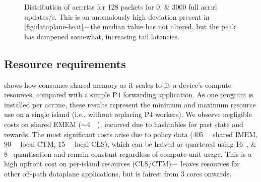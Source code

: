 \begin{figure}
	\centering
		\caption[Distribution of RTTs for \qty{128}{\byte} packets for \numlist{0;3000} full RL updates/s.]{Distribution of \glspl{acr:rtt} for \qty{128}{\byte} packets for \numlist{0;3000} full \gls{acr:rl} updates/s. This is an anomalously high deviation present in \cref{fig:dataplane-heat}---the median value has not altered, but the peak has dampened somewhat, increasing tail latencies.\label{fig:dataplane-example}}
	
\end{figure}

\subsection{Resource requirements}
 shows how \approachshort{} consumes shared memory as it scales to fit a device's compute resources, compared with a simple P4 forwarding application.
As one program is installed per \gls{acr:me}, these results represent the minimum and maximum resource use on a single island (i.e., without replacing P4 workers).
We observe negligible costs on shared EMEM ($\sim$\qty{4}{\mebi\byte}), incurred due to hashtables for past state and rewards.
The most significant costs arise due to policy data (\qty{405}{\kibi\byte} shared IMEM, \qty{90}{\kibi\byte} local CTM, \qty{15}{\kibi\byte} local CLS), which can be halved or quartered using \qtylist{16;8}{\bit} quantisation and remain constant regardless of compute unit usage.
This is a high upfront cost on per-island resources (CLS/CTM)---\approachshort{} leaves resources for other off-path dataplane applications, but is fairest from 3 cores onwards.

